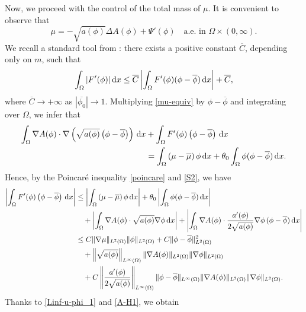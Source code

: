 \documentclass[11pt,reqno]{amsart}
\theoremstyle{remark}
\def\d{{\rm d}}
\numberwithin{equation}{section}
\def\d{{\rm d}}
\begin{document}
Now, we proceed with the control of the total mass of $\mu$. It is convenient to observe that
\begin{equation}
\label{mu-equiv}
\mu= -\sqrt{a(\phi)}\Delta A(\phi) + \Psi'(\phi)\quad \text{a.e. in } \Omega \times (0,\infty).
\end{equation}
We recall a standard tool from \cite{MZ}: there exists a positive constant $\overline{C}$, depending only on $m$, such that
\begin{equation}
\label{MZ}
\int_\Omega| F'(\phi)|\, \d x\leq \overline{C}
\left|\int_\Omega F'(\phi)(\phi-\overline{\phi} )\, \d x\right|+\overline{C},
\end{equation}
where $\overline{C} \to +\infty$ as $|\overline{\phi_0}|\to 1$.
Multiplying \eqref{mu-equiv} by $\phi-\overline{\phi}$ and integrating over $\Omega$, we infer that
\begin{align*}
\int_{\Omega} \nabla A(\phi) \cdot \nabla \left(
\sqrt{a(\phi)} \left(\phi-\overline{\phi} \right) \right) \, \d x
&+
\int_{\Omega} F'(\phi) \left( \phi-\overline{\phi} \right) \, \d x
\\
&= \int_\Omega \left( \mu -\overline{\mu}\right) \phi \, \d x
+ \theta_0 \int_\Omega \phi (\phi-\overline{\phi}) \, \d x.
\end{align*}
Hence, by the Poincar\'{e} inequality \eqref{poincare} and \eqref{S2}, we have
\begin{align*}
\left| \int_{\Omega} F'(\phi) \left( \phi-\overline{\phi} \right) \, \d x \right|
&\leq \left| \int_\Omega \left( \mu -\overline{\mu}\right) \phi \, \d x \right|
+ \theta_0 \left| \int_\Omega \phi (\phi-\overline{\phi}) \, \d x\right|
\\
& \quad + \left| \int_{\Omega} \nabla A(\phi) \cdot
\sqrt{a(\phi)} \nabla \phi  \, \d x \right|
+ \left| \int_{\Omega} \nabla A(\phi) \cdot
\frac{a'(\phi)}{2\sqrt{a(\phi)}} \nabla \phi \,  ( \phi-\overline{\phi})  \, \d x \right|
\\
& \leq C \| \nabla \mu\|_{L^2(\Omega)} \| \phi\|_{L^2(\Omega)}
+ C \| \phi -\overline{\phi}\|_{L^2(\Omega)}^2
\\
&\quad
+ \left\| \sqrt{a(\phi)} \right\|_{L^\infty(\Omega)}
\| \nabla A(\phi)\|_{L^2(\Omega)} \| \nabla \phi\|_{L^2(\Omega)}
\\
&\quad +C \left\| \frac{a'(\phi)}{2\sqrt{a(\phi)}} \right\|_{L^\infty(\Omega)} \| \phi-\overline{\phi}\|_{L^\infty(\Omega)}
\| \nabla A(\phi)\|_{L^2(\Omega)} \| \nabla \phi\|_{L^2(\Omega)}.
\end{align*}
Thanks to \eqref{Linf-u-phi_1} and \eqref{A-H1}, we obtain
\end{document}
